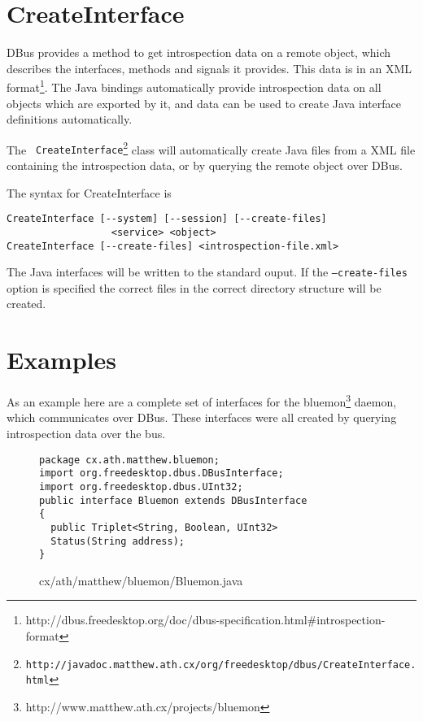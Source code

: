 \documentclass[a4paper,12pt]{article}
\begin{document}
\section{CreateInterface}
\label{sec:create}

DBus provides a method to get introspection data on a remote object,
which describes the interfaces, methods and signals it provides.
This data is in an XML
format\footnote{http://dbus.freedesktop.org/doc/dbus-specification.html\#introspection-format}.
The Java bindings automatically provide introspection data on all
objects which are exported by it, and data can be used to create
Java interface definitions automatically.

The {\tt
CreateInterface\footnote{http://javadoc.matthew.ath.cx/org/freedesktop/dbus/CreateInterface.html}}
class will automatically create Java files from a XML file
containing the introspection data, or by querying the remote object
over DBus.

The syntax for CreateInterface is

\begin{verbatim}
CreateInterface [--system] [--session] [--create-files] 
                  <service> <object>
CreateInterface [--create-files] <introspection-file.xml>
\end{verbatim}

The Java interfaces will be written to the standard ouput. If the
{\tt --create-files} option is specified the correct files in the
correct directory structure will be created.

\section{Examples}

As an example here are a complete set of interfaces for the
bluemon\footnote{http://www.matthew.ath.cx/projects/bluemon} daemon,
which communicates over DBus. These interfaces were all created by
querying introspection data over the bus.

\newpage

\begin{figure}[!h]
\begin{center}
\begin{verbatim}
package cx.ath.matthew.bluemon;
import org.freedesktop.dbus.DBusInterface;
import org.freedesktop.dbus.UInt32;
public interface Bluemon extends DBusInterface
{
  public Triplet<String, Boolean, UInt32> 
  Status(String address);
}
\end{verbatim}
\end{center}
\caption{cx/ath/matthew/bluemon/Bluemon.java}
\end{figure}
\end{document}
